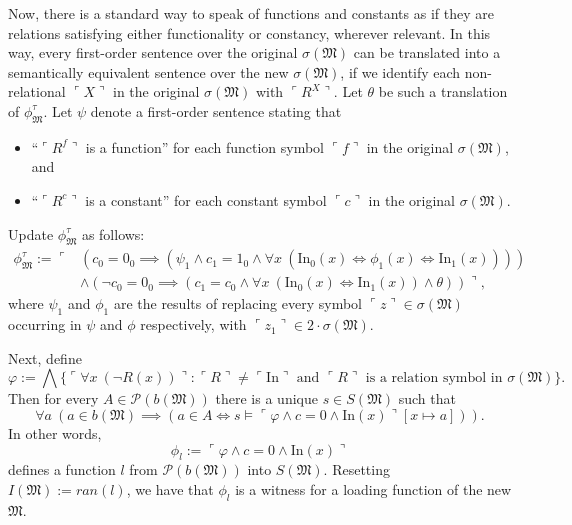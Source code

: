 \documentclass[12pt, twoside]{memoir}
\numberwithin{equation}{section}
\theoremstyle{definition}
\theoremstyle{remark}
\theoremstyle{definition}
\theoremstyle{definition}
\theoremstyle{definition}
\theoremstyle{remark}
\begin{document}
Now, there is a standard way to speak of functions and constants as if they are relations satisfying either functionality or constancy, wherever relevant. In this way, every first-order sentence over the original $\sigma(\mathfrak{M})$ can be translated into a semantically equivalent sentence over the new $\sigma(\mathfrak{M})$, if we identify each non-relational $\ulcorner X \urcorner$ in the original $\sigma(\mathfrak{M})$ with $\ulcorner R^X \urcorner$. Let $\theta$ be such a translation of $\phi^{\tau}_{\mathfrak{M}}$. Let $\psi$ denote a first-order sentence stating that 
\begin{itemize}
    \item ``$\ulcorner R^f \urcorner$ is a function'' for each function symbol $\ulcorner f \urcorner$ in the original $\sigma(\mathfrak{M})$, and
    \item ``$\ulcorner R^c \urcorner$ is a constant'' for each constant symbol $\ulcorner c \urcorner$ in the original $\sigma(\mathfrak{M})$.
\end{itemize}
Update $\phi^{\tau}_{\mathfrak{M}}$ as follows: 
\begin{align*}
    \phi^{\tau}_{\mathfrak{M}} := \ulcorner & (c_0 = 0_0 \implies (\psi_1 \wedge c_1 = 1_0 \wedge \forall x \ (\mathrm{In}_0 (x) \iff \phi_1 (x) \iff \mathrm{In}_1 (x)))) \\
    & \wedge (\neg c_0 = 0_0 \implies (c_1 = c_0 \wedge \forall x \ (\mathrm{In}_0 (x) \iff \mathrm{In}_1 (x)) \wedge \theta)) \urcorner \text{,}
\end{align*}
where $\psi_1$ and $\phi_1$ are the results of replacing every symbol $\ulcorner z \urcorner \in \sigma(\mathfrak{M})$ occurring in $\psi$ and $\phi$ respectively, with $\ulcorner z_1 \urcorner \in 2 \cdot \sigma(\mathfrak{M})$. 

Next, define 
\begin{equation*}
    \varphi := \bigwedge \{\ulcorner \forall x \ (\neg R(x)) \urcorner : \ulcorner R \urcorner \neq \ulcorner \mathrm{In} \urcorner \text{ and } \ulcorner R \urcorner \text{ is a relation symbol in } \sigma(\mathfrak{M})\} \text{.}
\end{equation*}
Then for every $A \in \mathcal{P}(b(\mathfrak{M}))$ there is a unique $s \in S(\mathfrak{M})$ such that 
\begin{equation*}
    \forall a \ (a \in b(\mathfrak{M}) \implies (a \in A \iff s \models \ulcorner \varphi \wedge c = 0 \wedge \mathrm{In}(x) \urcorner [x \mapsto a])) \text{.}
\end{equation*}
In other words, 
\begin{equation*}
    \phi_l := \ulcorner \varphi \wedge c = 0 \wedge \mathrm{In}(x) \urcorner
\end{equation*}
defines a function $l$ from $\mathcal{P}(b(\mathfrak{M}))$ into $S(\mathfrak{M})$. Resetting $I(\mathfrak{M}) := ran(l)$, we have that $\phi_l$ is a witness for a loading function of the new $\mathfrak{M}$. 
\end{document}
